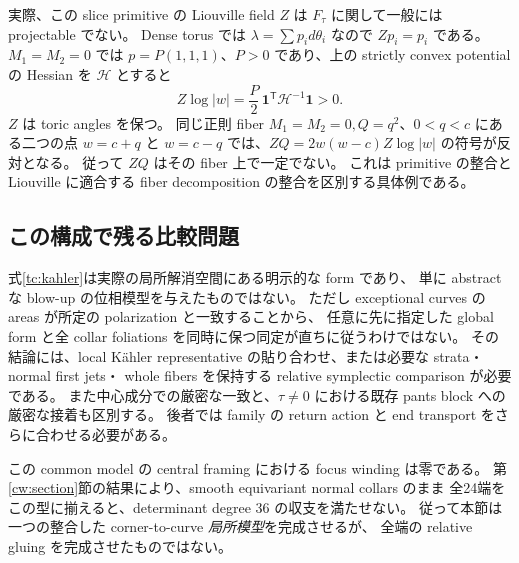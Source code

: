 \begin{remark}\label{tc:nonprojectable}
実際、この slice primitive の Liouville field $Z$ は $F_\tau$ に関して一般には projectable でない。
Dense torus では $\lambda=\sum p_i d\theta_i$ なので $Zp_i=p_i$ である。
$M_1=M_2=0$ では $p=P(1,1,1)$、$P>0$ であり、上の strictly convex potential の Hessian を
$\mathcal H$ とすると
\[
 Z\log|w|=\frac P2\,\boldsymbol1^{\mathsf T}\mathcal H^{-1}\boldsymbol1>0.
\]
$Z$ は toric angles を保つ。
同じ正則 fiber $M_1=M_2=0,Q=q^2$、$0<q<c$ にある二つの点
$w=c+q$ と $w=c-q$ では、$ZQ=2w(w-c)Z\log|w|$ の符号が反対となる。
従って $ZQ$ はその fiber 上で一定でない。
これは primitive の整合と Liouville に適合する fiber decomposition の整合を区別する具体例である。
\end{remark}

\subsection{この構成で残る比較問題}

式\eqref{tc:kahler}は実際の局所解消空間にある明示的な form であり、
単に abstract な blow-up の位相模型を与えたものではない。
ただし exceptional curves の areas が所定の polarization と一致することから、
任意に先に指定した global form と全 collar foliations を同時に保つ同定が直ちに従うわけではない。
その結論には、local Kähler representative の貼り合わせ、または必要な strata・normal first jets・
whole fibers を保持する relative symplectic comparison が必要である。
また中心成分での厳密な一致と、$\tau\ne0$ における既存 pants block への厳密な接着も区別する。
後者では family の return action と end transport をさらに合わせる必要がある。

この common model の central framing における focus winding は零である。
第\ref{cw:section}節の結果により、smooth equivariant normal collars のまま
全24端をこの型に揃えると、determinant degree 36 の収支を満たせない。
従って本節は一つの整合した corner-to-curve \emph{局所模型}を完成させるが、
全端の relative gluing を完成させたものではない。
